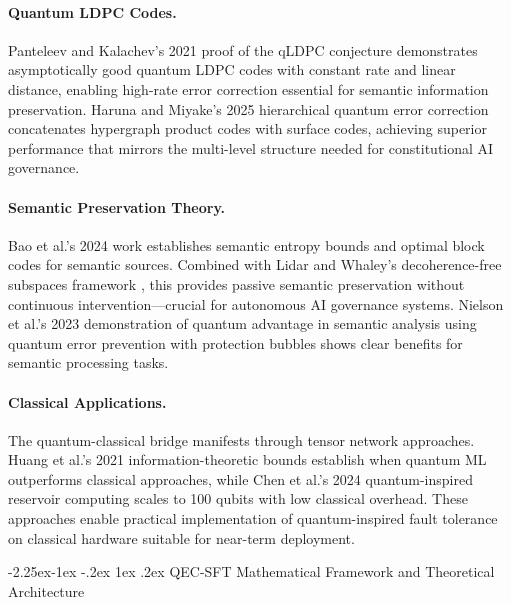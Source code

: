 \documentclass[manuscript,screen,9pt]{acmart}
\makeatletter
\renewcommand\subsection{\@startsection{subsection}{2}{\z@}%
  {-2.25ex\@plus -1ex \@minus -.2ex}%
  {1ex \@plus .2ex}%
  {\normalfont\large\bfseries}}
\makeatother
\begin{document}
\paragraph{Quantum LDPC Codes.} Panteleev and Kalachev's 2021 proof of the qLDPC conjecture \cite{Panteleev2021QuantumLDPC} demonstrates asymptotically good quantum LDPC codes with constant rate and linear distance, enabling high-rate error correction essential for semantic information preservation. Haruna and Miyake's 2025 hierarchical quantum error correction \cite{Haruna2025HierarchicalQEC} concatenates hypergraph product codes with surface codes, achieving superior performance that mirrors the multi-level structure needed for constitutional AI governance.

\paragraph{Semantic Preservation Theory.} Bao et al.'s 2024 work \cite{Bao2024SemanticEntropy} establishes semantic entropy bounds and optimal block codes for semantic sources. Combined with Lidar and Whaley's decoherence-free subspaces framework \cite{Lidar2024DecoherenceFree}, this provides passive semantic preservation without continuous intervention—crucial for autonomous AI governance systems. Nielson et al.'s 2023 demonstration \cite{Nielson2023QuantumAdvantage} of quantum advantage in semantic analysis using quantum error prevention with protection bubbles shows clear benefits for semantic processing tasks.

\paragraph{Classical Applications.} The quantum-classical bridge manifests through tensor network approaches. Huang et al.'s 2021 information-theoretic bounds \cite{Huang2021QuantumML} establish when quantum ML outperforms classical approaches, while Chen et al.'s 2024 quantum-inspired reservoir computing \cite{Chen2024QuantumReservoir} scales to 100 qubits with low classical overhead. These approaches enable practical implementation of quantum-inspired fault tolerance on classical hardware suitable for near-term deployment.

\subsection{QEC-SFT Mathematical Framework and Theoretical Architecture}
\label{subsec:qec_sft_architecture}
\end{document}
